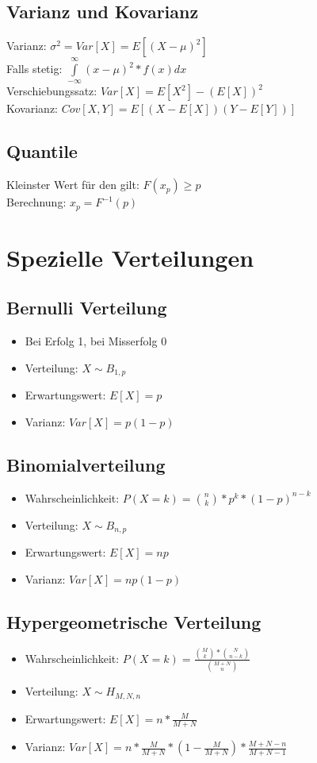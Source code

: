\documentclass[10pt,landscape,a4paper]{article}
\begin{document}
\begin{multicols}{3}
\subsection{Varianz und Kovarianz}
Varianz: $\sigma^2 = Var[X] = E[(X-\mu)^2]$ \\
Falls stetig: $\int\limits_{-\infty}^{\infty}(x-\mu)^2 * f(x) dx$ \\
Verschiebungssatz: $Var[X] = E[X^2]-(E[X])^2$ \\
Kovarianz: $Cov[X, Y] = E[(X-E[X])(Y-E[Y])]$

\subsection{Quantile}
Kleinster Wert für den gilt: $F(x_p)\geq p$ \\
Berechnung: $x_p = F^{-1}(p)$

\section{Spezielle Verteilungen}
\subsection{Bernulli Verteilung}
\begin{itemize}
	\setlength\itemsep{-0.5em}
	\item Bei Erfolg 1, bei Misserfolg 0
	\item Verteilung: $X \sim B_{1,p}$
	\item Erwartungswert: $E[X]=p$
	\item Varianz: $Var[X] = p(1-p)$
\end{itemize}

\subsection{Binomialverteilung}
\begin{itemize}
	\setlength\itemsep{-0.5em}
	\item Wahrscheinlichkeit: $P(X=k) = \binom{n}{k} * p^k * (1-p)^{n-k}$
	\item Verteilung: $X \sim B_{n,p}$
	\item Erwartungswert: $E[X] = np$
	\item Varianz: $Var[X] = np(1-p)$
\end{itemize}

\subsection{Hypergeometrische Verteilung}
\begin{itemize}
	\setlength\itemsep{-0.5em}
	\item Wahrscheinlichkeit: $P(X=k)= \frac{\binom{M}{k} * \binom{N}{n-k}}{\binom{M+N}{n}}$
	\item Verteilung: $X \sim H_{M,N,n}$
	\item Erwartungswert: $E[X] = n * \frac{M}{M+N}$
	\item Varianz: $Var[X] = n * \frac{M}{M+N} *(1 - \frac{M}{M+N}) * \frac{M+N-n}{M+N-1}$
\end{itemize}


\end{multicols}
\end{document}
